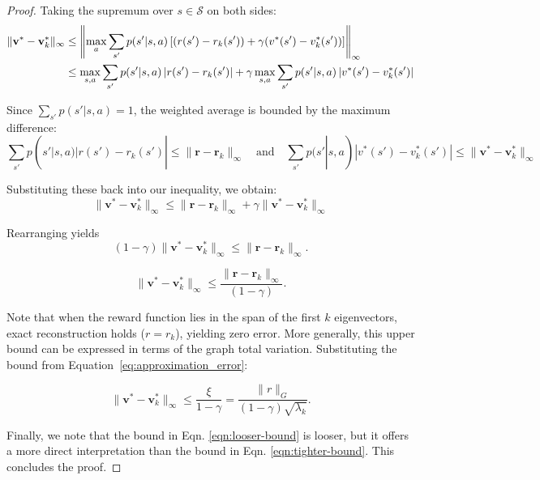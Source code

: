 \documentclass{article}
\theoremstyle{plain}
\theoremstyle{definition}
\theoremstyle{remark}
\begin{document}
\begin{proof}
Taking the supremum over $s \in \mathscr{S}$ on both sides:
\begin{align}
    \|\mathbf{v}^* - \mathbf{v}_k^*\|_{\infty} &\leq \left\| \max_a \sum_{s'} p(s'|s,a) \left[ (r(s') - r_k(s')) + \gamma(v^*(s') - v_k^*(s')) \right] \right\|_\infty \notag \\
    &\leq \max_{s,a} \sum_{s'} p(s'|s,a) \left| r(s') - r_k(s') \right| + \gamma \max_{s,a} \sum_{s'} p(s'|s,a) \left| v^*(s') - v_k^*(s') \right|
\end{align}

Since $\sum_{s'} p(s'|s,a) = 1$, the weighted average is bounded by the maximum difference:
\begin{equation}
    \sum_{s'} p(s'|s,a) |r(s') - r_k(s')| \leq \|\mathbf{r} - \mathbf{r}_k\|_{\infty} \quad \text{and} \quad \sum_{s'} p(s'|s,a) |v^*(s') - v_k^*(s')| \leq \|\mathbf{v}^* - \mathbf{v}_k^*\|_{\infty}
\end{equation}

Substituting these back into our inequality, we obtain:
\begin{equation}
    \|\mathbf{v}^* - \mathbf{v}_k^*\|_{\infty} \leq \|\mathbf{r} - \mathbf{r}_k\|_{\infty} + \gamma \|\mathbf{v}^* - \mathbf{v}_k^*\|_{\infty}
\end{equation}


Rearranging yields
\begin{equation}
    (1 - \gamma) \|\mathbf{v}^* - \mathbf{v}_k^*\|_{\infty} \leq \|\mathbf{r} - \mathbf{r}_k\|_{\infty}.
\end{equation}

\begin{equation}
    \|\mathbf{v}^* - \mathbf{v}_k^*\|_{\infty} \leq \frac{\|\mathbf{r} - \mathbf{r}_k\|_{\infty}}{(1 - \gamma)}.
    \label{eqn:tighter-bound}
\end{equation}

Note that when the reward function lies in the span of the first $k$ eigenvectors, exact reconstruction holds ($r = r_k$), yielding zero error.  More generally, this upper bound can be expressed in terms of the graph total variation. Substituting the bound from Equation~\ref{eq:approximation_error}:

\begin{equation}
    \|\mathbf{v}^* - \mathbf{v}_k^*\|_{\infty} \leq \frac{\xi}{1-\gamma} = \frac{\|r\|_G}{(1-\gamma)\sqrt{\lambda_k}}.
    \label{eqn:looser-bound}
\end{equation}

Finally, we note that the bound in Eqn. \ref{eqn:looser-bound} is looser, but it offers a more direct interpretation than the bound in Eqn. \ref{eqn:tighter-bound}. This concludes the proof.

\end{proof}
\end{document}

